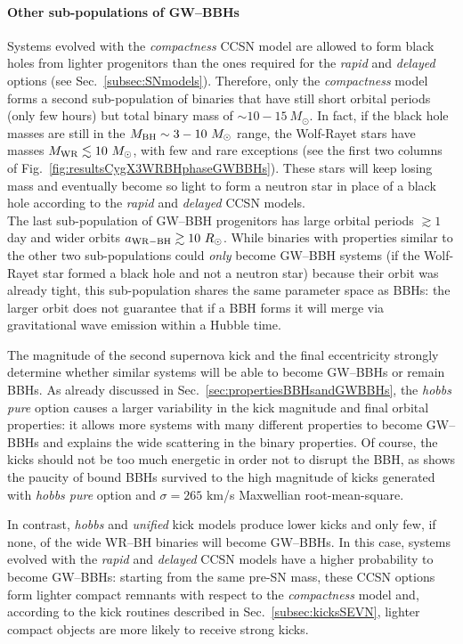 \documentclass[a4paper,titlepage]{book}     	%
\newcommand{\sun}{\ensuremath{_\odot}}
\newcommand{\msun}{\ensuremath{M\sun}}
\newcommand{\rsun}{R_{\odot}}
\newcommand{\mwr}{\ensuremath{M_\textup{WR}}}
\newcommand{\mbh}{\ensuremath{M_\textup{BH}}}
\begin{document}
\paragraph{Other sub-populations of GW--BBHs} Systems evolved with the \emph{compactness} CCSN model are allowed to form black holes from lighter progenitors than the ones required for the \emph{rapid} and \emph{delayed} options (see Sec.\ \ref{subsec:SNmodels}). Therefore, only the \emph{compactness} model forms a second sub-population of binaries that have still short orbital periods (only few hours) but total binary mass of $\sim 10 - 15~\msun$. In fact, if the black hole masses are still in the $\mbh \sim 3-10~\msun$ range, the Wolf-Rayet stars have masses $\mwr \lesssim 10~\msun$, with few and rare exceptions (see the first two columns of Fig.\ \ref{fig:resultsCygX3WRBHphaseGWBBHs}). These stars will keep losing mass and eventually become so light to form a neutron star in place of a black hole according to the \emph{rapid} and \emph{delayed} CCSN models.\\

The last sub-population of GW--BBH progenitors has large orbital periods $\gtrsim 1$ day and wider orbits $a_{\rm WR-BH} \gtrsim 10~\rsun$. While binaries with properties similar to the other two sub-populations could \emph{only} become GW--BBH systems (if the Wolf-Rayet star formed a black hole and not a neutron star) because their orbit was already tight, this sub-population shares the same parameter space as BBHs: the larger orbit does not guarantee that if a BBH forms it will merge via gravitational wave emission within a Hubble time. 

The magnitude of the second supernova kick and the final eccentricity strongly determine whether similar systems will be able to become GW--BBHs or remain BBHs. As already discussed in Sec.\ \ref{sec:propertiesBBHsandGWBBHs}, the \emph{hobbs pure} option causes a larger variability in the kick magnitude and final orbital properties: it allows more systems with many different properties to become GW--BBHs and explains the wide scattering in the binary properties. Of course, the kicks should not be too much energetic in order not to disrupt the BBH, as shows the paucity of bound BBHs survived to the high magnitude of kicks generated with \emph{hobbs pure} option and $\sigma = 265$ km/s Maxwellian root-mean-square. 

In contrast, \emph{hobbs} and \emph{unified} kick models produce lower kicks and only few, if none, of the wide WR--BH binaries will become GW--BBHs. In this case, systems evolved with the \emph{rapid} and \emph{delayed} CCSN models have a higher probability to become GW--BBHs: starting from the same pre-SN mass, these CCSN options form lighter compact remnants with respect to the \emph{compactness} model and, according to the kick routines described in Sec.\ \ref{subsec:kicksSEVN}, lighter compact objects are more likely to receive strong kicks.
\end{document}
